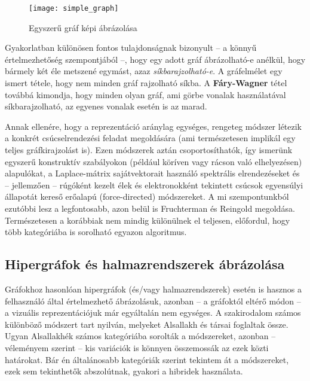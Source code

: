 \begin{figure}[H]
	\centering
	\texttt{[image: simple\_graph]}
	\caption{Egyszerű gráf képi ábrázolása}
\end{figure}

Gyakorlatban különösen fontos tulajdonságnak bizonyult -- a könnyű értelmezhetőség szempontjából --, hogy egy adott gráf ábrázolható-e anélkül, hogy bármely két éle metszené egymást, azaz \textit{síkbarajzolható-e}. A gráfelmélet egy ismert tétele, hogy nem minden gráf rajzolható síkba. A \textbf{Fáry-Wagner} tétel továbbá kimondja, hogy minden olyan gráf, ami görbe vonalak használatával síkbarajzolható, az egyenes vonalak esetén is az marad.

Annak ellenére, hogy a reprezentáció aránylag egységes, rengeteg módszer létezik a konkrét csúcselrendezési feladat megoldására (ami természetesen implikál egy teljes gráfkirajzolást is). Ezen módszerek aztán csoportosíthatók, így ismerünk egyszerű konstruktív szabályokon (például köríven vagy rácson való elhelyezésen) alapulókat\cite{graph_layout_circular, graph_layout_circular2, graph_layout_orthogonal}, a Laplace-mátrix sajátvektorait használó spektrális elrendezéseket\cite{graph_layout_spectral} és -- jellemzően -- rúgóként kezelt élek és elektronokként tekintett csúcsok egyensúlyi állapotát kereső erőalapú (force-directed) módszereket\cite{graph_layout_force_directed, graph_layout_force_directed2}. A mi szempontunkból ezutóbbi lesz a legfontosabb, azon belül is Fruchterman és Reingold megoldása\cite{graph_layout_fruchterman}. Természetesen a korábbiak nem mindig különülnek el teljesen, előfordul, hogy több kategóriába is sorolható egyazon algoritmus\cite{graph_layout_hybrid}.

\subsection{Hipergráfok és halmazrendszerek ábrázolása}

Gráfokhoz hasonlóan hipergráfok (és/vagy halmazrendszerek) esetén is hasznos a felhasználó által értelmezhető ábrázolásuk, azonban -- a gráfoktól eltérő módon -- a vizuális reprezentációjuk már egyáltalán nem egységes. A szakirodalom számos különböző módszert tart nyilván, melyeket Alsallakh és társai foglaltak össze\cite{alsallakah2016_the_state_of_the_art_set_visualization}. Ugyan Alsallakhék számos kategóriába sorolták a módszereket, azonban -- véleményem szerint -- kis variációk is könnyen összemossák az ezek közti határokat. Bár én általánosabb kategóriák szerint tekintem át a módszereket, ezek sem tekinthetők abszolútnak, gyakori a hibridek használata.

